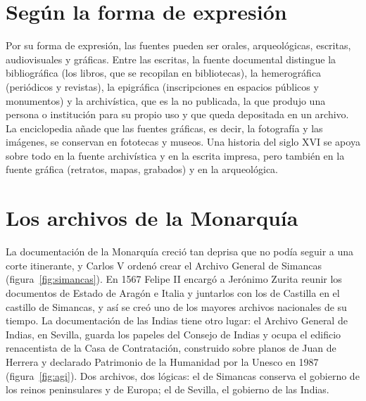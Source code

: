 \documentclass{book}
\begin{document}

\section{Según la forma de expresión}

Por su forma de expresión, las fuentes pueden ser orales, arqueológicas, escritas, audiovisuales y gráficas. Entre las escritas, la fuente documental distingue la bibliográfica (los libros, que se recopilan en bibliotecas), la hemerográfica (periódicos y revistas), la epigráfica (inscripciones en espacios públicos y monumentos) y la archivística, que es la no publicada, la que produjo una persona o institución para su propio uso y que queda depositada en un archivo. La enciclopedia añade que las fuentes gráficas, es decir, la fotografía y las imágenes, se conservan en fototecas y museos. Una historia del siglo XVI se apoya sobre todo en la fuente archivística y en la escrita impresa, pero también en la fuente gráfica (retratos, mapas, grabados) y en la arqueológica.


\section{Los archivos de la Monarquía}

La documentación de la Monarquía creció tan deprisa que no podía seguir a una corte itinerante, y Carlos V ordenó crear el Archivo General de Simancas (figura~\ref{fig:simancas}). En 1567 Felipe II encargó a Jerónimo Zurita reunir los documentos de Estado de Aragón e Italia y juntarlos con los de Castilla en el castillo de Simancas, y así se creó uno de los mayores archivos nacionales de su tiempo. La documentación de las Indias tiene otro lugar: el Archivo General de Indias, en Sevilla, guarda los papeles del Consejo de Indias y ocupa el edificio renacentista de la Casa de Contratación, construido sobre planos de Juan de Herrera y declarado Patrimonio de la Humanidad por la Unesco en 1987 (figura~\ref{fig:agi}). Dos archivos, dos lógicas: el de Simancas conserva el gobierno de los reinos peninsulares y de Europa; el de Sevilla, el gobierno de las Indias.

\end{document}
